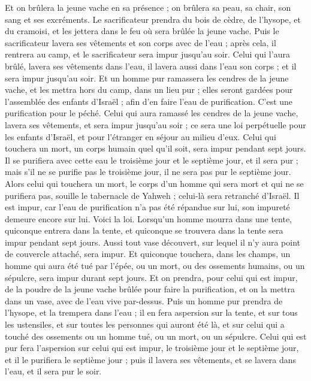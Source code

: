 \begin{multicols}{2}
Et on brûlera la jeune vache en sa présence ; on brûlera sa peau, sa chair, son sang et ses excréments.
Le sacrificateur prendra du bois de cèdre, de l'hysope, et du cramoisi, et les jettera dans le feu où sera brûlée la jeune vache.
Puis le sacrificateur lavera ses vêtements et son corps avec de l'eau ; après cela, il rentrera au camp, et le sacrificateur sera impur jusqu'au soir.
Celui qui l'aura brûlé, lavera ses vêtements dans l'eau, il lavera aussi dans l'eau son corps ; et il sera impur jusqu'au soir.
Et un homme pur ramassera les cendres de la jeune vache, et les mettra hors du camp, dans un lieu pur ; elles seront gardées pour l'assemblée des enfants d'Israël ; afin d'en faire l'eau de purification. C'est une purification pour le péché.
Celui qui aura ramassé les cendres de la jeune vache, lavera ses vêtements, et sera impur jusqu'au soir ; ce sera une loi perpétuelle pour les enfants d'Israël, et pour l'étranger en séjour au milieu d'eux.
Celui qui touchera un mort, un corps humain quel qu'il soit, sera impur pendant sept jours.
Il se purifiera avec cette eau le troisième jour et le septième jour, et il sera pur ; mais s'il ne se purifie pas le troisième jour, il ne sera pas pur le septième jour.
Alors celui qui touchera un mort, le corps d'un homme qui sera mort et qui ne se purifiera pas, souille le tabernacle de Yahweh ; celui-là sera retranché d'Israël. Il est impur, car l'eau de purification n'a pas été répandue sur lui, son impureté demeure encore sur lui.
Voici la loi. Lorsqu'un homme mourra dans une tente, quiconque entrera dans la tente, et quiconque se trouvera dans la tente sera impur pendant sept jours.
Aussi tout vase découvert, sur lequel il n'y aura point de couvercle attaché, sera impur.
Et quiconque touchera, dans les champs, un homme qui aura été tué par l'épée, ou un mort, ou des ossements humains, ou un sépulcre, sera impur durant sept jours.
Et on prendra, pour celui qui est impur, de la poudre de la jeune vache brûlée pour faire la purification, et on la mettra dans un vase, avec de l'eau vive par-dessus.
Puis un homme pur prendra de l'hysope, et la trempera dans l'eau ; il en fera aspersion sur la tente, et sur tous les ustensiles, et sur toutes les personnes qui auront été là, et sur celui qui a touché des ossements ou un homme tué, ou un mort, ou un sépulcre.
Celui qui est pur fera l'aspersion sur celui qui est impur, le troisième jour et le septième jour, et il le purifiera le septième jour ; puis il lavera ses vêtements, et se lavera dans l'eau, et il sera pur le soir.

\end{multicols}

